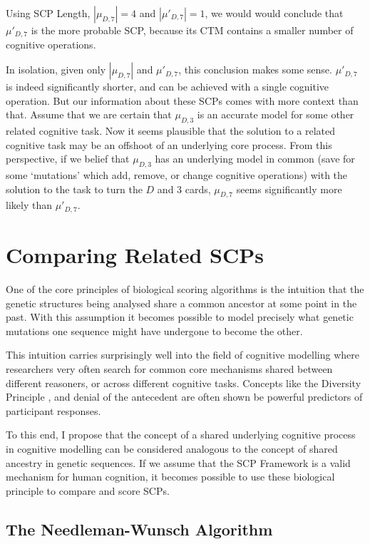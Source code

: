Using SCP Length, $|\mu_{D,7}|=4$ and $|\mu'_{D,7}|=1$, we would would conclude that $\mu'_{D,7}$ is the more probable SCP, because its CTM contains a smaller number of cognitive operations.

In isolation, given only $|\mu_{D,7}|$ and $\mu'_{D,7}$, this conclusion makes some sense. $\mu'_{D,7}$ is indeed significantly shorter, and can be achieved with a single cognitive operation. But our information about these SCPs comes with more context than that. Assume that we are certain that $\mu_{D,3}$ is an accurate model for some other related cognitive task. Now it seems plausible that the solution to a related cognitive task may be an offshoot of an underlying core process. From this perspective, if we belief that $\mu_{D,3}$ has an underlying model in common (save for some `mutations' which add, remove, or change cognitive operations) with the solution to the task to turn the $D$ and $3$ cards, $\mu_{D,7}$ seems significantly more likely than $\mu'_{D,7}$.

\section{Comparing Related SCPs} \label{ssec:compExt}

One of the core principles of biological scoring algorithms is the intuition that the genetic structures being analysed share a common ancestor at some point in the past. With this assumption it becomes possible to model precisely what genetic mutations one sequence might have undergone to become the other.

This intuition carries surprisingly well into the field of cognitive modelling where researchers very often search for common core mechanisms shared between different reasoners, or across different cognitive tasks. Concepts like the Diversity Principle \citep{heit2005defending}, and denial of the antecedent are often shown be powerful predictors of participant responses.

To this end, I propose that the concept of a shared underlying cognitive process in cognitive modelling can be considered analogous to the concept of shared ancestry in genetic sequences. If we assume that the SCP Framework is a valid mechanism for human cognition, it becomes possible to use these biological principle to compare and score SCPs.

\subsection{The Needleman-Wunsch Algorithm} \label{ssec:nw}

